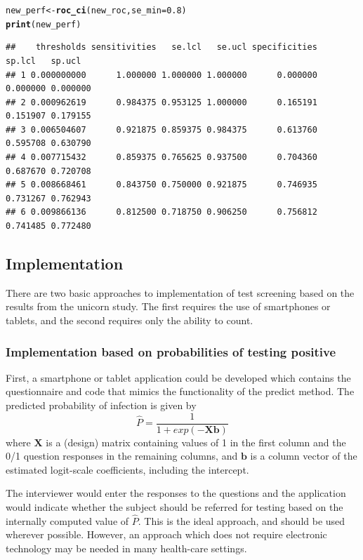 \documentclass[11pt]{report}\usepackage[]{graphicx}\usepackage[]{xcolor}
\makeatletter
\newcommand{\hlnum}[1]{\textcolor[rgb]{0.686,0.059,0.569}{#1}}%
\newcommand{\hlstd}[1]{\textcolor[rgb]{0.345,0.345,0.345}{#1}}%
\newcommand{\hlkwb}[1]{\textcolor[rgb]{0.69,0.353,0.396}{#1}}%
\newcommand{\hlkwc}[1]{\textcolor[rgb]{0.333,0.667,0.333}{#1}}%
\newcommand{\hlkwd}[1]{\textcolor[rgb]{0.737,0.353,0.396}{\textbf{#1}}}%
\newenvironment{kframe}{%
 \def\at@end@of@kframe{}%
 \ifinner\ifhmode%
  \def\at@end@of@kframe{\end{minipage}}%
  \begin{minipage}{\columnwidth}%
 \fi\fi%
 \def\FrameCommand##1{\hskip\@totalleftmargin \hskip-\fboxsep
 \colorbox{shadecolor}{##1}\hskip-\fboxsep
     \hskip-\linewidth \hskip-\@totalleftmargin \hskip\columnwidth}%
 \MakeFramed {\advance\hsize-\width
   \@totalleftmargin\z@ \linewidth\hsize
   \@setminipage}}%
 {\par\unskip\endMakeFramed%
 \at@end@of@kframe}
\newenvironment{knitrout}{}{} %
\makeatother
\begin{document}
\begin{knitrout}
\color{fgcolor}\begin{kframe}
\begin{alltt}
\hlstd{new_perf} \hlkwb{<-} \hlkwd{roc_ci}\hlstd{(new_roc,} \hlkwc{se_min} \hlstd{=} \hlnum{0.8}\hlstd{)}
\hlkwd{print}\hlstd{(new_perf)}
\end{alltt}
\begin{verbatim}
##    thresholds sensitivities   se.lcl   se.ucl specificities   sp.lcl   sp.ucl
## 1 0.000000000      1.000000 1.000000 1.000000      0.000000 0.000000 0.000000
## 2 0.000962619      0.984375 0.953125 1.000000      0.165191 0.151907 0.179155
## 3 0.006504607      0.921875 0.859375 0.984375      0.613760 0.595708 0.630790
## 4 0.007715432      0.859375 0.765625 0.937500      0.704360 0.687670 0.720708
## 5 0.008668461      0.843750 0.750000 0.921875      0.746935 0.731267 0.762943
## 6 0.009866136      0.812500 0.718750 0.906250      0.756812 0.741485 0.772480
\end{verbatim}
\end{kframe}
\end{knitrout}

\subsection*{Implementation}

There are two basic approaches to implementation of test screening
based on the results from the unicorn study.  The first requires the use of
smartphones or tablets, and the second requires only the ability to count.

\subsubsection*{Implementation based on probabilities of testing positive}

First, a smartphone or tablet application could be developed which
contains the questionnaire and code that mimics the functionality of
the \textsf{predict} method.  The predicted probability of infection is given
by
\[\hat{P} = \frac{1}{1 + exp(-\mathbf{Xb})}\] where $\mathbf{X}$ is a
(design) matrix containing values of 1 in the first column and the 0/1
question responses in the remaining columns, and $\mathbf{b}$ is a
column vector of the estimated logit-scale coefficients, including the
intercept.

The interviewer would enter the responses to the questions and the
application would indicate whether the subject should be referred for
testing based on the internally computed value of $\hat{P}$. This is
the ideal approach, and should be used wherever possible. However, an
approach which does not require electronic technology may be needed in
many health-care settings.
\end{document}
